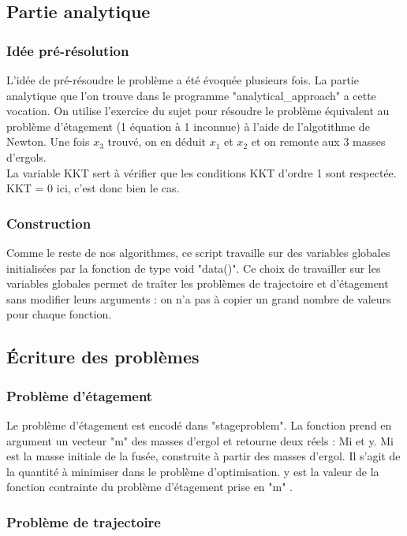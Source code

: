 \subsection{Partie analytique}\medbreak

\subsubsection{Idée pré-résolution}\medbreak
L'idée de pré-résoudre le problème a été évoquée plusieurs fois. La partie analytique que l'on trouve dans le programme "analytical\_approach" a cette vocation. On utilise l'exercice du sujet pour résoudre le problème équivalent au problème d'étagement (1 équation à 1 inconnue) à l'aide de l'algotithme de Newton. Une fois $x_3$ trouvé, on en déduit $x_1$ et $x_2$ et on remonte aux 3 masses d'ergols.\\
La variable KKT sert à vérifier que les conditions KKT d'ordre 1 sont respectée. KKT = 0 ici, c'est donc bien le cas.\medbreak
\subsubsection{Construction}\medbreak
Comme le reste de nos algorithmes, ce script travaille sur des variables globales initialisées par la fonction de type void "data()". Ce choix de travailler sur les variables globales permet de traîter les problèmes de trajectoire et d'étagement sans modifier leurs arguments : on n'a pas à copier un grand nombre de valeurs pour chaque fonction.


\subsection{\'Ecriture des problèmes}\medbreak
\subsubsection{Problème d'étagement}\medbreak
Le problème d'étagement est encodé dans "stageproblem". La fonction prend en argument un vecteur "m" des masses d'ergol et retourne deux réels : Mi et y. Mi est la masse initiale de la fusée, construite à partir des masses d'ergol. Il s'agit de la quantité à minimiser dans le problème d'optimisation. y est la valeur de la fonction contrainte du problème d'étagement prise en "m" .\medbreak
\subsubsection{Problème de trajectoire}\medbreak

